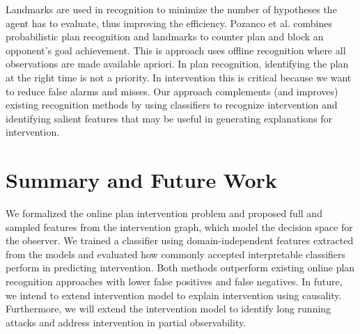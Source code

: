 \documentclass[letterpaper]{article}
\theoremstyle{plain}
\begin{document}
Landmarks are used in recognition to minimize the number of hypotheses the agent has to evaluate, thus improving the efficiency. Pozanco et al.  combines probabilistic plan recognition and landmarks to counter plan and block an opponent's goal achievement. This is approach uses offline recognition where all observations are made available apriori. In plan recognition, identifying the plan at the right time is not a priority. In intervention this is critical because we want to reduce false alarms and misses. Our approach complements (and improves) existing recognition methods by using classifiers to recognize intervention and identifying salient features that may be useful in generating explanations for intervention.

\section{Summary and Future Work}
We formalized the online plan intervention problem and proposed full and sampled features from the intervention graph, which model the decision space for the observer. We trained a classifier using domain-independent features extracted from the models and evaluated how commonly accepted interpretable classifiers perform in predicting intervention. Both methods outperform existing online plan recognition approaches with lower false positives and false negatives. In future, we intend to extend intervention model to explain intervention using causality. Furthermore, we will extend the intervention model to identify long running attacks and address intervention in partial observability.
\clearpage %
\begin{small}


\end{small}
\end{document}
